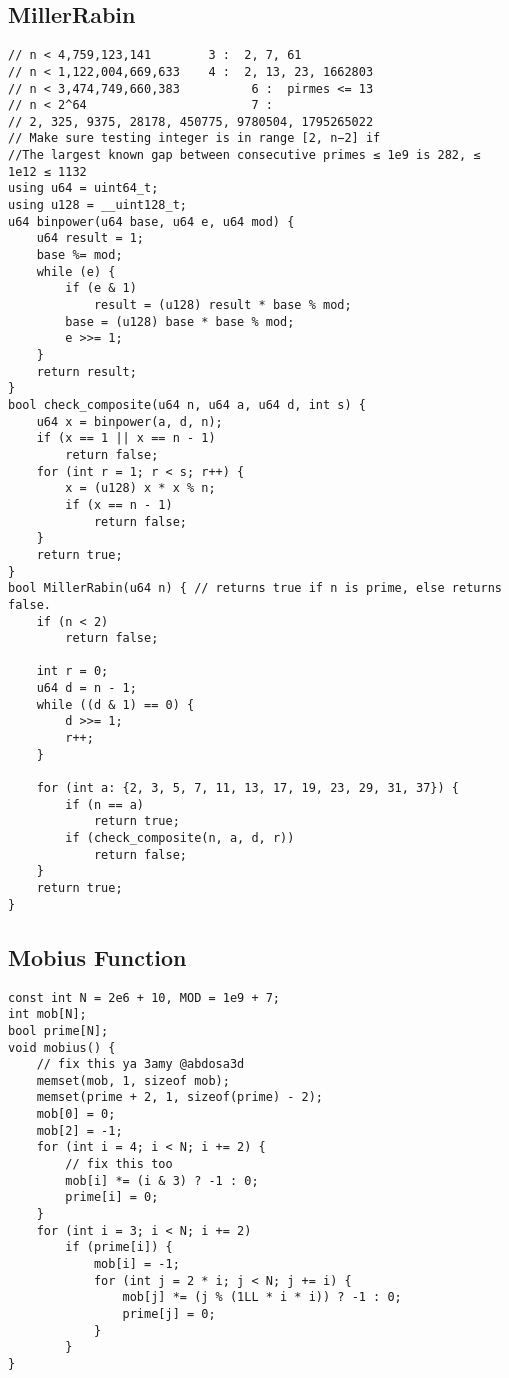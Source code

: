 \documentclass{article}
\begin{document}
\subsection{MillerRabin}
\begin{verbatim}
// n < 4,759,123,141        3 :  2, 7, 61  
// n < 1,122,004,669,633    4 :  2, 13, 23, 1662803  
// n < 3,474,749,660,383          6 :  pirmes <= 13  
// n < 2^64                       7 :  
// 2, 325, 9375, 28178, 450775, 9780504, 1795265022  
// Make sure testing integer is in range [2, n−2] if
//The largest known gap between consecutive primes ≤ 1e9 is 282, ≤ 1e12 ≤ 1132
using u64 = uint64_t;
using u128 = __uint128_t;
u64 binpower(u64 base, u64 e, u64 mod) {
    u64 result = 1;
    base %= mod;
    while (e) {
        if (e & 1)
            result = (u128) result * base % mod;
        base = (u128) base * base % mod;
        e >>= 1;
    }
    return result;
}
bool check_composite(u64 n, u64 a, u64 d, int s) {
    u64 x = binpower(a, d, n);
    if (x == 1 || x == n - 1)
        return false;
    for (int r = 1; r < s; r++) {
        x = (u128) x * x % n;
        if (x == n - 1)
            return false;
    }
    return true;
}
bool MillerRabin(u64 n) { // returns true if n is prime, else returns false.
    if (n < 2)
        return false;

    int r = 0;
    u64 d = n - 1;
    while ((d & 1) == 0) {
        d >>= 1;
        r++;
    }

    for (int a: {2, 3, 5, 7, 11, 13, 17, 19, 23, 29, 31, 37}) {
        if (n == a)
            return true;
        if (check_composite(n, a, d, r))
            return false;
    }
    return true;
}
\end{verbatim}

\subsection{Mobius Function}
\begin{verbatim}
const int N = 2e6 + 10, MOD = 1e9 + 7;
int mob[N];
bool prime[N];
void mobius() {
	// fix this ya 3amy @abdosa3d
    memset(mob, 1, sizeof mob);
    memset(prime + 2, 1, sizeof(prime) - 2);
    mob[0] = 0;
    mob[2] = -1;
    for (int i = 4; i < N; i += 2) {
	    // fix this too 
        mob[i] *= (i & 3) ? -1 : 0;
        prime[i] = 0;
    }
    for (int i = 3; i < N; i += 2)
        if (prime[i]) {
            mob[i] = -1;
            for (int j = 2 * i; j < N; j += i) {
                mob[j] *= (j % (1LL * i * i)) ? -1 : 0;
                prime[j] = 0;
            }
        }
}
\end{verbatim}
\end{document}
